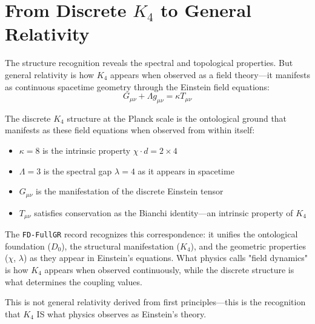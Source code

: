 \documentclass[11pt,a4paper]{book}
\begin{document}
\section{From Discrete \texorpdfstring{$K_4$}{K4} to General Relativity}

The structure recognition reveals the spectral and topological properties. But general 
relativity is how $K_4$ appears when observed as a field theory—it manifests as continuous spacetime geometry through the Einstein field equations:
\[
G_{\mu\nu} + \Lambda g_{\mu\nu} = \kappa T_{\mu\nu}
\]

The discrete $K_4$ structure at the Planck scale is the ontological ground that manifests as these field equations when observed from within itself:
\begin{itemize}
\item $\kappa = 8$ is the intrinsic property $\chi \cdot d = 2 \times 4$
\item $\Lambda = 3$ is the spectral gap $\lambda = 4$ as it appears in spacetime
\item $G_{\mu\nu}$ is the manifestation of the discrete Einstein tensor
\item $T_{\mu\nu}$ satisfies conservation as the Bianchi identity—an intrinsic property of $K_4$
\end{itemize}

The \texttt{FD-FullGR} record recognizes this correspondence: it unifies the ontological 
foundation ($D_0$), the structural manifestation ($K_4$), and the geometric properties 
($\chi$, $\lambda$) as they appear in Einstein's equations. What physics calls "field dynamics" 
is how $K_4$ appears when observed continuously, while the discrete structure is what determines the coupling values.

This is not general relativity derived from first principles—this is the recognition that $K_4$ IS what physics observes as Einstein's theory.
\end{document}
